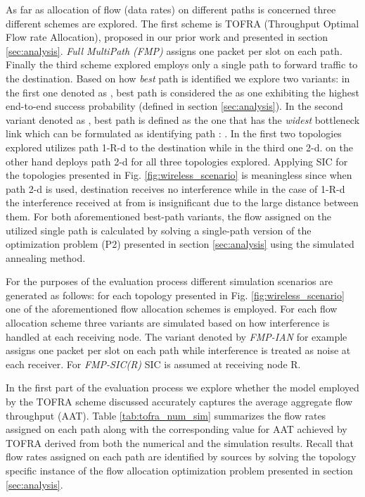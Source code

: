 \documentclass[conference]{IEEEtran}
\begin{document}
As far as allocation of flow (data rates) on different paths is concerned three different schemes are explored. The first scheme is TOFRA
(Throughput Optimal Flow rate Allocation), proposed in our prior work \cite{6824997, DBLP:journals/corr/PloumidisPT14}
and presented in section \ref{sec:analysis}.
\textit{Full MultiPath (FMP)} assigns one packet per slot on each path. Finally the third scheme explored employs only a single path to forward traffic
to the destination. Based on how \textit{best} path is identified we explore two variants: in the first one denoted as , best path is
considered the as one exhibiting the highest end-to-end success probability (defined in section \ref{sec:analysis}).
In the second variant denoted as , best path is defined as the one that has the \textit{widest} bottleneck link
which can be formulated as identifying path
 : .
In the first two topologies explored  utilizes path 1-R-d to the destination while in the third one 2-d.
 on the other hand deploys path 2-d for all three topologies explored.
Applying SIC for the topologies presented in Fig. \ref{fig:wireless_scenario} is meaningless since when path
2-d is used, destination  receives no interference while in the case of 1-R-d the interference received at  from 
is insignificant due to the large distance between them.
For both aforementioned best-path variants, the flow assigned on the utilized single path is calculated by solving a single-path version of the optimization problem (P2) presented in section
\ref{sec:analysis} using the simulated annealing method. 

For the purposes of the evaluation process different simulation scenarios are generated as follows: for each topology presented
in Fig. \ref{fig:wireless_scenario} one of the aforementioned flow allocation schemes is employed. For each flow allocation scheme three
variants are simulated based on how interference is handled at each receiving node. The variant denoted by \textit{FMP-IAN} for example
assigns one packet per slot on each path while interference is treated as noise at each receiver. For \textit{FMP-SIC(R)} SIC is assumed at receiving node R.

In the first part of the evaluation process we explore whether the model employed by the TOFRA scheme discussed accurately captures
the average aggregate flow throughput (AAT).
Table \ref{tab:tofra_num_sim} summarizes the flow rates assigned on each path along with the corresponding value for AAT achieved by TOFRA
derived from both the numerical and the simulation results.
Recall that flow rates assigned on each path are identified by sources by solving the topology specific instance of the
flow allocation optimization problem presented in section \ref{sec:analysis}.
\end{document}
